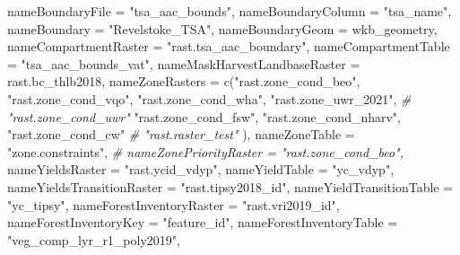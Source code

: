 \documentclass[
]{article}
\newenvironment{Shaded}{\begin{snugshade}}{\end{snugshade}}
\newcommand{\AttributeTok}[1]{\textcolor[rgb]{0.77,0.63,0.00}{#1}}
\newcommand{\CommentTok}[1]{\textcolor[rgb]{0.56,0.35,0.01}{\textit{#1}}}
\newcommand{\FunctionTok}[1]{\textcolor[rgb]{0.00,0.00,0.00}{#1}}
\newcommand{\NormalTok}[1]{#1}
\newcommand{\StringTok}[1]{\textcolor[rgb]{0.31,0.60,0.02}{#1}}
\begin{document}
\begin{Shaded}
\begin{Highlighting}[]
                           \AttributeTok{nameBoundaryFile =} \StringTok{"tsa\_aac\_bounds"}\NormalTok{,}
                           \AttributeTok{nameBoundaryColumn =} \StringTok{"tsa\_name"}\NormalTok{,}
                           \AttributeTok{nameBoundary =} \StringTok{"Revelstoke\_TSA"}\NormalTok{,}
                           \AttributeTok{nameBoundaryGeom =} \StringTok{\textquotesingle{}wkb\_geometry\textquotesingle{}}\NormalTok{,}
                           \AttributeTok{nameCompartmentRaster =} \StringTok{"rast.tsa\_aac\_boundary"}\NormalTok{,}
                           \AttributeTok{nameCompartmentTable =} \StringTok{"tsa\_aac\_bounds\_vat"}\NormalTok{,}
                           \AttributeTok{nameMaskHarvestLandbaseRaster =} \StringTok{\textquotesingle{}rast.bc\_thlb2018\textquotesingle{}}\NormalTok{,}
                           \AttributeTok{nameZoneRasters =} \FunctionTok{c}\NormalTok{(}\StringTok{"rast.zone\_cond\_beo"}\NormalTok{, }
                                             \StringTok{"rast.zone\_cond\_vqo"}\NormalTok{, }
                                             \StringTok{"rast.zone\_cond\_wha"}\NormalTok{, }
                                             \StringTok{"rast.zone\_uwr\_2021"}\NormalTok{, }\CommentTok{\# "rast.zone\_cond\_uwr"}
                                             \StringTok{"rast.zone\_cond\_fsw"}\NormalTok{, }
                                             \StringTok{"rast.zone\_cond\_nharv"}\NormalTok{, }
                                             \StringTok{"rast.zone\_cond\_cw"}
                                             \CommentTok{\# "rast.raster\_test"}
\NormalTok{                                               ),}
                           \AttributeTok{nameZoneTable =} \StringTok{"zone.constraints"}\NormalTok{,}
                           \CommentTok{\# nameZonePriorityRaster = "rast.zone\_cond\_beo",}
                           \AttributeTok{nameYieldsRaster =} \StringTok{"rast.ycid\_vdyp"}\NormalTok{,}
                           \AttributeTok{nameYieldTable =} \StringTok{"yc\_vdyp"}\NormalTok{,}
                           \AttributeTok{nameYieldsTransitionRaster =} \StringTok{"rast.tipsy2018\_id"}\NormalTok{,}
                           \AttributeTok{nameYieldTransitionTable =} \StringTok{"yc\_tipsy"}\NormalTok{,}
                           \AttributeTok{nameForestInventoryRaster =} \StringTok{"rast.vri2019\_id"}\NormalTok{,}
                           \AttributeTok{nameForestInventoryKey =} \StringTok{"feature\_id"}\NormalTok{,}
                           \AttributeTok{nameForestInventoryTable =} \StringTok{"veg\_comp\_lyr\_r1\_poly2019"}\NormalTok{,}

\end{Highlighting}
\end{Shaded}
\end{document}

